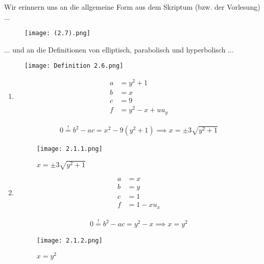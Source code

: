 \begin{solution}

Wir erinnern uns an die allgemeine Form aus dem Skriptum (bzw. der Vorlesung) ...

\begin{figure}[h!]
    \centering
    \texttt{[image: (2.7).png]}
\end{figure}

... und an die Definitionen von elliptisch, parabolisch und hyperbolisch ...

\begin{figure}[h!]
    \centering
    \texttt{[image: Definition 2.6.png]}
\end{figure}

\begin{enumerate}[label = (\roman*)]

    \item

    \begin{align*}
        a & = y^2 + 1 \\
        b & = x \\
        c & = 9 \\
        f & = y^2 - x + u u_y
    \end{align*}

    \begin{align*}
        0 \stackrel{!}{=}
        b^2 - ac
        =
        x^2 - 9 (y^2 + 1)
        \implies
        x = \pm 3 \sqrt{y^2 + 1}
    \end{align*}

    \begin{figure}[h!]
        \centering
        \texttt{[image: 2.1.1.png]}
        \caption{$x = \pm 3 \sqrt{y^2 + 1}$}
    \end{figure}

    \item

    \begin{align*}
        a & = x \\
        b & = y \\
        c & = 1 \\
        f & = 1 - x u_x
    \end{align*}

    \begin{align*}
        0 \stackrel{!}{=}
        b^2 - ac
        =
        y^2 - x
        \implies
        x = y^2
    \end{align*}

    \begin{figure}[h!]
        \centering
        \texttt{[image: 2.1.2.png]}
        \caption{$x = y^2$}
    \end{figure}


\end{enumerate}
\end{solution}
